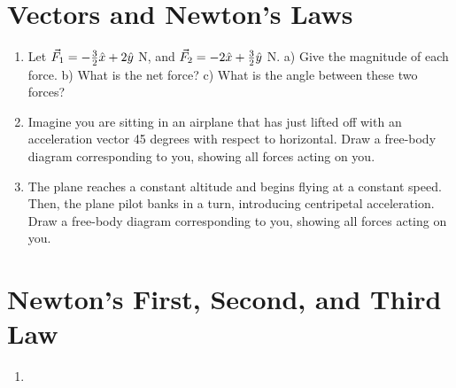 \documentclass[10pt]{article}
\begin{document}
\maketitle

\section{Vectors and Newton's Laws}
\begin{enumerate}
\item Let $\vec{F}_{\rm 1} = -\frac{3}{2}\hat{x} + 2\hat{y}$ N, and $\vec{F}_{\rm 2} = -2\hat{x} + \frac{3}{2}\hat{y}$ N.  a) Give the magnitude of each force.  b) What is the net force?  c) What is the angle between these two forces? \vspace{2.0 cm}
\item Imagine you are sitting in an airplane that has just lifted off with an acceleration vector 45 degrees with respect to horizontal.  Draw a free-body diagram corresponding to you, showing all forces acting on you.
\vspace{2.0 cm}
\item The plane reaches a constant altitude and begins flying at a constant speed.  Then, the plane pilot banks in a turn, introducing centripetal acceleration.  Draw a free-body diagram corresponding to you, showing all forces acting on you.
\vspace{2.0 cm}
\end{enumerate}
\section{Newton's First, Second, and Third Law}
\begin{enumerate}
\item 
\end{enumerate}
\end{document}
